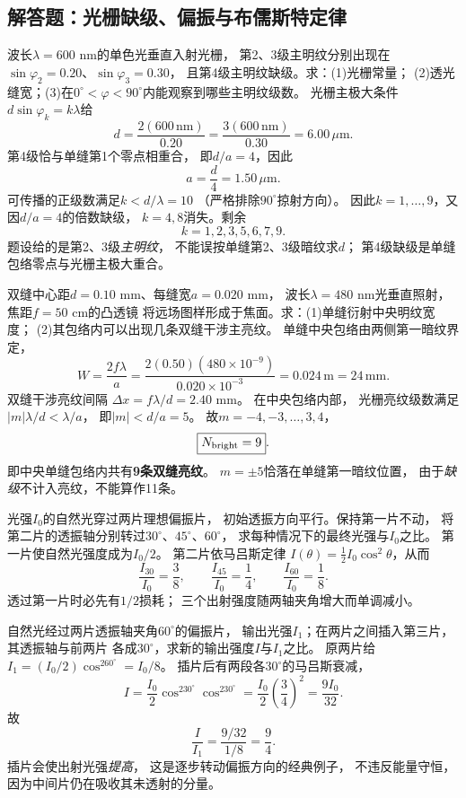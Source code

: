 \subsection{解答题：光栅缺级、偏振与布儒斯特定律}

\problemtext 波长$\lambda=600$ nm的单色光垂直入射光栅，
第2、3级主明纹分别出现在
$\sin\varphi_2=0.20$、$\sin\varphi_3=0.30$，
且第4级主明纹缺级。求：(1)光栅常量；
(2)透光缝宽；(3)在$0^\circ<\varphi<90^\circ$内能观察到哪些主明纹级数。
\workings
光栅主极大条件
$d\sin\varphi_k=k\lambda$给
\[
\boxed{d=\frac{2(600\,\mathrm{nm})}{0.20}
=\frac{3(600\,\mathrm{nm})}{0.30}=6.00\,\mu\mathrm m}.
\]
第4级恰与单缝第1个零点相重合，
即$d/a=4$，因此
\[
\boxed{a=\frac d4=1.50\,\mu\mathrm m}.
\]
可传播的正级数满足$k<d/\lambda=10$
（严格排除$90^\circ$掠射方向）。
因此$k=1,\ldots,9$，又因$d/a=4$的倍数缺级，
$k=4,8$消失。剩余
\[
\boxed{k=1,2,3,5,6,7,9}.
\]
\crosscheck 题设给的是第2、3级\emph{主明纹}，
不能误按单缝第2、3级暗纹求$d$；
第4级缺级是单缝包络零点与光栅主极大重合。

\problemtext 双缝中心距$d=0.10$ mm、每缝宽$a=0.020$ mm，
波长$\lambda=480$ nm光垂直照射，焦距$f=50$ cm的凸透镜
将远场图样形成于焦面。求：(1)单缝衍射中央明纹宽度；
(2)其包络内可以出现几条双缝干涉主亮纹。
\workings
单缝中央包络由两侧第一暗纹界定，
\[
\boxed{W=\frac{2f\lambda}{a}
=\frac{2(0.50)(480\times10^{-9})}
{0.020\times10^{-3}}
=0.024\,\mathrm m=24\,\mathrm{mm}}.
\]
双缝干涉亮纹间隔
$\Delta x=f\lambda/d=2.40$ mm。
在中央包络内部，
光栅亮纹级数满足
$|m|\lambda/d<\lambda/a$，
即$|m|<d/a=5$。
故$m=-4,-3,\ldots,3,4$，
\[
\boxed{N_{\rm bright}=9}.
\]
即中央单缝包络内共有\textbf{9条双缝亮纹}。
\crosscheck $m=\pm5$恰落在单缝第一暗纹位置，
由于\emph{缺级}不计入亮纹，不能算作11条。

\problemtext 光强$I_0$的自然光穿过两片理想偏振片，
初始透振方向平行。保持第一片不动，
将第二片的透振轴分别转过$30^\circ$、$45^\circ$、$60^\circ$，
求每种情况下的最终光强与$I_0$之比。
\workings
第一片使自然光强度成为$I_0/2$。
第二片依马吕斯定律
$I(\theta)=\tfrac12I_0\cos^2\theta$，从而
\[
\boxed{\frac{I_{30}}{I_0}=\frac38},\qquad
\boxed{\frac{I_{45}}{I_0}=\frac14},\qquad
\boxed{\frac{I_{60}}{I_0}=\frac18}.
\]
\crosscheck 透过第一片时必先有$1/2$损耗；
三个出射强度随两轴夹角增大而单调减小。

\problemtext 自然光经过两片透振轴夹角$60^\circ$的偏振片，
输出光强$I_1$；在两片之间插入第三片，其透振轴与前两片
各成$30^\circ$，求新的输出强度$I$与$I_1$之比。
\workings
原两片给
$I_1=(I_0/2)\cos^260^\circ=I_0/8$。
插片后有两段各$30^\circ$的马吕斯衰减，
\[
I=\frac{I_0}{2}\cos^230^\circ\cos^230^\circ
=\frac{I_0}{2}\left(\frac34\right)^2
=\frac{9I_0}{32}.
\]
故
\[
\boxed{\frac I{I_1}=\frac{9/32}{1/8}=\frac94}.
\]
\crosscheck 插片会使出射光强\emph{提高}，
这是逐步转动偏振方向的经典例子，
不违反能量守恒，因为中间片仍在吸收其未透射的分量。

